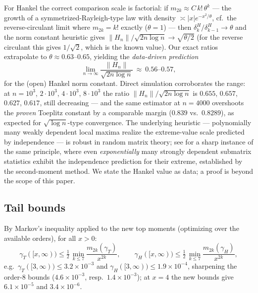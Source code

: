 ﻿\documentclass[11pt]{article}
\theoremstyle{remark}
\newcommand{\gT}{\gamma_T}
\newcommand{\gH}{\gamma_H}
\begin{document}
For Hankel the correct comparison scale is factorial: if
$m_{2k}\approx C\,k!\,\theta^{k}$ --- the growth of a symmetrized-Rayleigh-type law
with density $\asymp|x|e^{-x^2/\theta}$, cf.\ the reverse-circulant limit where
$m_{2k}=k!$ exactly ($\theta=1$) --- then $\delta^H_k/\delta^H_{k-1}\to\theta$ and the
norm constant heuristic gives $\|H_n\|/\sqrt{2n\log n}\to\sqrt{\theta/2}$ (for the
reverse circulant this gives $1/\sqrt2$, which is the known value). Our exact ratios
extrapolate to $\theta\approx0.63$--$0.65$, yielding the \emph{data-driven prediction}
\[
\lim_{n\to\infty}\frac{\|H_n\|}{\sqrt{2n\log n}}\ \approx\ 0.56\text{--}0.57 ,
\]
for the (open) Hankel norm constant. Direct simulation corroborates the range:
at $n=10^3$, $2\cdot10^3$, $4\cdot10^3$, $8\cdot10^3$ the ratio
$\|H_n\|/\sqrt{2n\log n}$ is $0.655$, $0.657$, $0.627$, $0.617$, still decreasing --- and the same estimator at
$n=4000$ overshoots the \emph{proven} Toeplitz constant by a comparable margin
($0.839$ vs.\ $0.8289$), as expected for $\sqrt{\log n}$-type convergence. The
underlying heuristic --- polynomially many weakly dependent local maxima realize the
extreme-value scale predicted by independence --- is robust in random matrix theory;
see \cite{ShmaloPR} for a sharp instance of the same principle, where even
\emph{exponentially} many strongly dependent submatrix statistics exhibit the
independence prediction for their extreme, established by the second-moment method.
We state the Hankel value as data; a proof is beyond the scope of this paper.

\subsection{Tail bounds}
By Markov's inequality applied to the new top moments (optimizing over the available
orders), for all $x>0$:
\[
\gT([x,\infty))\le\tfrac12\,\min_{k\le7}\frac{m_{2k}(\gT)}{x^{2k}},\qquad
\gH([x,\infty))\le\tfrac12\,\min_{k\le7}\frac{m_{2k}(\gH)}{x^{2k}},
\]
e.g.\ $\gT([3,\infty))\le 3.2\times10^{-3}$ and $\gH([3,\infty))\le1.9\times10^{-4}$,
sharpening the order-$8$ bounds ($4.6\times10^{-3}$, resp.\ $1.4\times10^{-3}$); at
$x=4$ the new bounds give $6.1\times10^{-5}$ and $3.4\times10^{-6}$.
\end{document}
